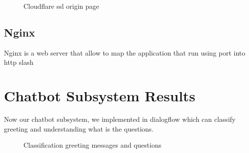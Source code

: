 \documentclass[12pt,oneside,openright,a4paper]{cpe-english-project}
\begin{document}
\pagebreak
		\begin{figure}[!h]\centering
			\caption{Cloudflare ssl origin page}\label{fig:Cloudflare ssl origin page}
		\end{figure}
	\subsection{Nginx}
		Nginx is a web server that allow to map the application that run using port into http slash
\section{Chatbot Subsystem Results}
	Now our chatbot subsystem, we implemented in dialogflow which can classify greeting and understanding what is the questions.
	\begin{figure}[!h]\centering
		\caption{Classification greeting messages and questions}\label{fig:Classification greeting messages and questions success}
	\end{figure}
\pagebreak
\end{document}
